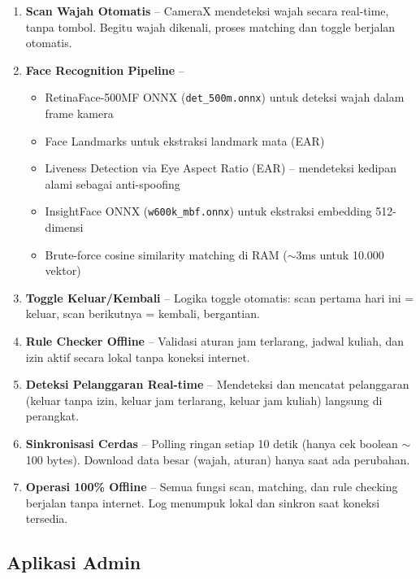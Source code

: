 \documentclass[12pt,a4paper]{article}
\begin{document}
\begin{enumerate}[nolistsep]
  \item \textbf{Scan Wajah Otomatis} -- CameraX mendeteksi wajah secara real-time, tanpa tombol. Begitu wajah dikenali, proses matching dan toggle berjalan otomatis.
  \item \textbf{Face Recognition Pipeline} --
    \begin{itemize}[nolistsep]
      \item RetinaFace-500MF ONNX (\texttt{det\_500m.onnx}) untuk deteksi wajah dalam frame kamera
      \item Face Landmarks untuk ekstraksi landmark mata (EAR)
      \item Liveness Detection via Eye Aspect Ratio (EAR) -- mendeteksi kedipan alami sebagai anti-spoofing
      \item InsightFace ONNX (\texttt{w600k\_mbf.onnx}) untuk ekstraksi embedding 512-dimensi
      \item Brute-force cosine similarity matching di RAM ($\sim$3ms untuk 10.000 vektor)
    \end{itemize}
  \item \textbf{Toggle Keluar/Kembali} -- Logika toggle otomatis: scan pertama hari ini = keluar, scan berikutnya = kembali, bergantian.
  \item \textbf{Rule Checker Offline} -- Validasi aturan jam terlarang, jadwal kuliah, dan izin aktif secara lokal tanpa koneksi internet.
  \item \textbf{Deteksi Pelanggaran Real-time} -- Mendeteksi dan mencatat pelanggaran (keluar tanpa izin, keluar jam terlarang, keluar jam kuliah) langsung di perangkat.
  \item \textbf{Sinkronisasi Cerdas} -- Polling ringan setiap 10 detik (hanya cek boolean $\sim$100 bytes). Download data besar (wajah, aturan) hanya saat ada perubahan.
  \item \textbf{Operasi 100\% Offline} -- Semua fungsi scan, matching, dan rule checking berjalan tanpa internet. Log menumpuk lokal dan sinkron saat koneksi tersedia.
\end{enumerate}

\subsection{Aplikasi Admin}
\end{document}
